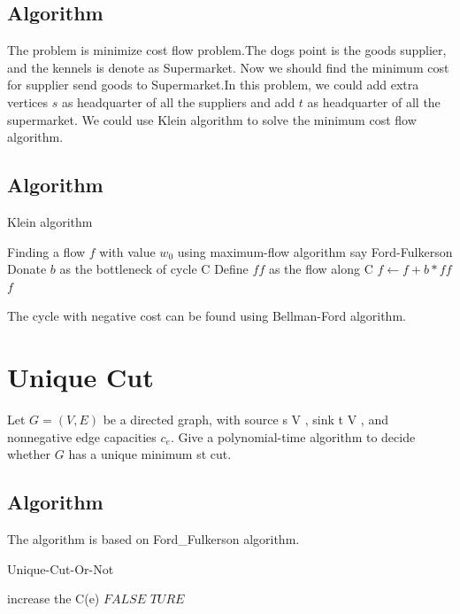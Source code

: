 \documentclass{article}
\numberwithin{equation}{section}
\begin{document}
    \subsection{Algorithm}
    The problem is minimize cost flow problem.The dogs point is the goods supplier, and the kennels is denote as Supermarket. Now we should find the minimum cost for supplier send goods to Supermarket.In this problem, we could add extra vertices $s$ as headquarter of all the suppliers and add $t$ as headquarter of all the supermarket. We could use Klein algorithm to solve the minimum cost flow algorithm.
    \subsection{Algorithm}
    \begin{algorithm}
    \caption{Klein algorithm}
    \label{alg1}
        \begin{algorithmic}[1]
            \STATE Finding  a flow $f$ with value $w_0$ using maximum-flow algorithm say Ford-Fulkerson    
            \LOOP
                    \STATE Donate $b$ as the bottleneck of cycle C
                    \STATE Define $ff$ as the flow along C
                    \STATE $f \gets f + b*ff$ 
                \ENDIF
            \ENDLOOP
            \RETURN $f$
        \end{algorithmic}
    \end{algorithm}
    The cycle with negative cost can be found using Bellman-Ford algorithm.

%
%
\section{Unique Cut}
Let $G = (V,E)$ be a directed graph, with source s \in V , sink t \in V , and
nonnegative edge capacities $c_e$. Give a polynomial-time algorithm to decide
whether $G$ has a unique minimum st cut.
    \subsection{Algorithm}
    The algorithm is based on Ford\_Fulkerson algorithm.

        \begin{algorithm}
            \caption{Unique-Cut-Or-Not}
            \label{alg2}
            \begin{algorithmic}[1]
                     \STATE increase the C(e)
                        \RETURN $FALSE$
                     \ENDIF
                \ENDFOR
                \RETURN $TURE$
            \end{algorithmic}
        \end{algorithm}
\end{document}
